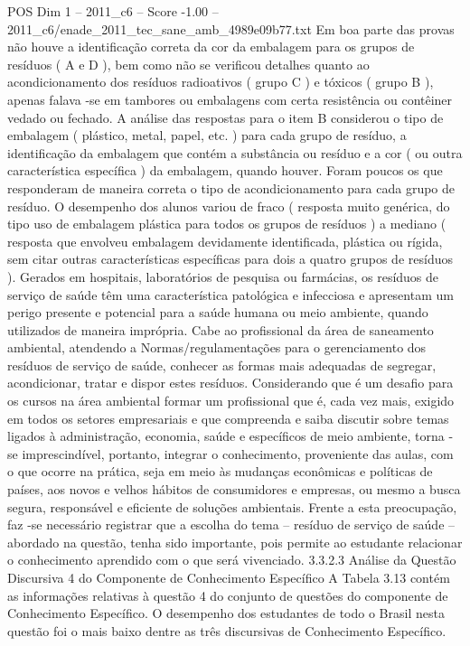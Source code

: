 \begin{textsample}{POS Dim 1 – 2011\_c6 – Score -1.00 – 2011\_c6/enade\_2011\_tec\_sane\_amb\_4989e09b77.txt}
Em boa parte das provas não houve a identificação correta da cor da embalagem para os grupos de resíduos ( A e D ), bem como não se verificou detalhes quanto ao acondicionamento dos resíduos radioativos ( grupo C ) e tóxicos ( grupo B ), apenas falava -se em tambores ou embalagens com certa resistência ou contêiner vedado ou fechado.
A análise das respostas para o item B considerou o tipo de embalagem ( plástico, metal, papel, etc. ) para cada grupo de resíduo, a identificação da embalagem que contém a substância ou resíduo e a cor ( ou outra característica específica ) da embalagem, quando houver.
Foram poucos os que responderam de maneira correta o tipo de acondicionamento para cada grupo de resíduo.
O desempenho dos alunos variou de fraco ( resposta muito genérica, do tipo uso de embalagem plástica para todos os grupos de resíduos ) a mediano ( resposta que envolveu embalagem devidamente identificada, plástica ou rígida, sem citar outras características específicas para dois a quatro grupos de resíduos ).
Gerados em hospitais, laboratórios de pesquisa ou farmácias, os resíduos de serviço de saúde têm uma característica patológica e infecciosa e apresentam um perigo presente e potencial para a saúde humana ou meio ambiente, quando utilizados de maneira imprópria.
Cabe ao profissional da área de saneamento ambiental, atendendo a Normas/regulamentações para o gerenciamento dos resíduos de serviço de saúde, conhecer as formas mais adequadas de segregar, acondicionar, tratar e dispor estes resíduos.
Considerando que é um desafio para os cursos na área ambiental formar um profissional que é, cada vez mais, exigido em todos os setores empresariais e que compreenda e saiba discutir sobre temas ligados à administração, economia, saúde e específicos de meio ambiente, torna -se imprescindível, portanto, integrar o conhecimento, proveniente das aulas, com o que ocorre na prática, seja em meio às mudanças econômicas e políticas de países, aos novos e velhos hábitos de consumidores e empresas, ou mesmo a busca segura, responsável e eficiente de soluções ambientais.
Frente a esta preocupação, faz -se necessário registrar que a escolha do tema – resíduo de serviço de saúde – abordado na questão, tenha sido importante, pois permite ao estudante relacionar o conhecimento aprendido com o que será vivenciado. 3.3.2.3 Análise da Questão Discursiva 4 do Componente de Conhecimento Específico A Tabela 3.13 contém as informações relativas à questão 4 do conjunto de questões do componente de Conhecimento Específico.
O desempenho dos estudantes de todo o Brasil nesta questão foi o mais baixo dentre as três discursivas de Conhecimento Específico.

\end{textsample}
